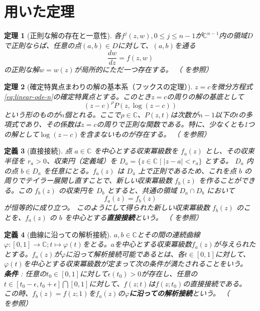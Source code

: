 \documentclass[paper=a4, fontsize=11pt]{jlreq} %
\theoremstyle{break}
\newtheorem{theorem}{定理}[section]
\newtheorem{definition}[theorem]{定義}
\theoremstyle{qa}
\theoremstyle{remark} %
\begin{document}
\section{用いた定理}%
\begin{theorem}[正則な解の存在と一意性]\label{thm:cauchy}
    各$f^{j}(z,w),0\leq j\leq n-1$が$\mathbb{C}^{n-1}$内の領域$D$で正則ならば、任意の点$(a,b)\in D$に対して、$(a,b)$を通る
    \begin{equation}\label{eq:cauchy_problem}
    \frac{dw}{dz}=f(z,w)
    \end{equation}
    の正則な解$w=w(z)$が局所的にただ一つ存在する。
    （\cite[p.50 定理8.1]{book:takano} を参照）
\end{theorem}
\begin{theorem}[確定特異点まわりの解の基本系（フックスの定理）]\label{thm:fuchs}
    $z=c$を微分方程式\eqref{eq:linear-ode-n}の確定特異点とする。このとき$z=c$の周りの解の基底として
    \[
    (z-c)^{\rho}P(z,\log(z-c))
    \]
    という形のものが$n$個とれる。ここで$\rho\in \mathbb{C}$、$P(z,t)$は次数が$n-1$以下の$t$の多項式であり、その係数は$z=c$の周りで正則な関数である。特に、少なくとも1つの解として$\log(z-c)$を含まないものが存在する。
    （\cite[p.119 定理13.1]{book:takano} を参照）
\end{theorem}
\begin{definition}[直接接続]
    点 $a \in \mathbb{C}$ を中心とする収束冪級数を $f_a(z)$ とし、その収束半径を $r_a > 0$、収束円（定義域）を $D_a = \{z \in \mathbb{C} \mid |z - a| < r_a\}$ とする。
    $D_a$ 内の点 $b \in D_a$ を任意にとる。$f_a(z)$ は $D_a$ 上で正則であるため、これを点 $b$ の周りでテイラー展開し直すことで、新しい収束冪級数 $f_b(z)$ を作ることができる。この $f_b(z)$ の収束円を $D_b$ とすると、共通の領域 $D_a \cap D_b$ において
    \[
    f_a(z) = f_b(z)
    \]
    が恒等的に成り立つ。
    このようにして得られた新しい収束冪級数 $f_b(z)$ のことを、$f_a(z)$ の $b$ を中心とする\textbf{直接接続}という。
    （\cite[p.101]{book:kimura} を参照）
\end{definition}
\begin{definition}[曲線に沿っての解析接続]
    $a,b\in\mathbb{C}$とその間の連続曲線$\varphi:[0,1]\to\mathbb{C};t\mapsto \varphi(t)$をとる。$a$を中心とする収束冪級数$f_{a}(z)$が与えられたとする。$f_{a}(z)$が$\varphi$に沿って解析接続可能であるとは、各$t\in[0,1]$に対して、$\varphi(t)$を中心とする収束冪級数が定まって次の条件が満たされることをいう。\\
    \textbf{条件} : 任意の$t_{0}\in[0,1]$に対して$\epsilon(t_{0})>0$が存在し、任意の$t\in[t_{0}-\epsilon,t_{0}+\epsilon]\bigcap[0,1]$に対して、$f(z;t)$は$f(z;t_{0})$の直接接続である。\\
    この時、$f_{b}(z)=f(z;1)$を$f_{a}(z)$の\textbf{$\varphi$に沿っての解析接続}という。
    （\cite[p.119 定義21.1]{book:kimura} を参照）
\end{definition}
\end{document}
